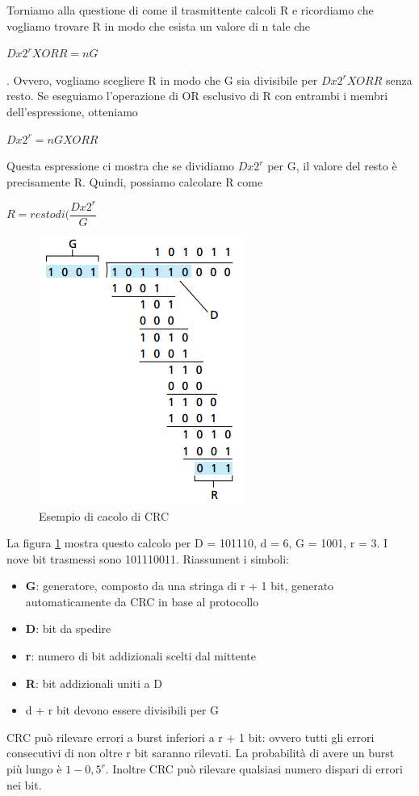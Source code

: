 \documentclass[11pt,a4paper]{article}
\begin{document}
Torniamo alla questione di come il trasmittente calcoli R e ricordiamo che vogliamo trovare R in modo che esista un valore di n tale che 
\begin{center}
	$D x 2^{r} XOR R = nG$
\end{center}. Ovvero, vogliamo scegliere R in modo che G sia divisibile per $D x 2^{r} XOR R$ senza resto. Se eseguiamo l'operazione di OR esclusivo di R con entrambi i membri dell'espressione, otteniamo 
\begin{center}
	$ D x 2^{r} = nG XOR R$
\end{center}
Questa espressione ci mostra che se dividiamo $D x 2^{r}$ per G, il valore del resto è precisamente R. Quindi, possiamo calcolare R come
\begin{center}
	$R = resto di (\dfrac{D x 2^{r}}{G}$
\end{center} 
\begin{figure}
	\begin{center}
		\includegraphics[scale=0.6]{img/074.png}
		\caption{Esempio di cacolo di CRC}
		\label{fig: 074}
	\end{center}
\end{figure}
La figura \ref{fig: 074} mostra questo calcolo per D = 101110, d = 6, G = 1001, r = 3. I nove bit trasmessi sono  101110011.
Riassument i simboli:
\begin{itemize}
	\item \textbf{G}: generatore, composto da una stringa di r + 1 bit, generato automaticamente da CRC in base al protocollo 
	\item \textbf{D}: bit da spedire
	\item \textbf{r}: numero di bit addizionali scelti dal mittente
	\item \textbf{R}: bit addizionali uniti a D
	\item d + r bit devono essere divisibili per G
\end{itemize}
CRC può rilevare errori a burst inferiori a r + 1 bit: ovvero tutti gli errori consecutivi di non oltre r bit saranno rilevati. La probabilità di avere un burst più lungo è $1 - 0,5^{r}$. Inoltre CRC può rilevare qualsiasi numero dispari di errori nei bit.
\end{document}

